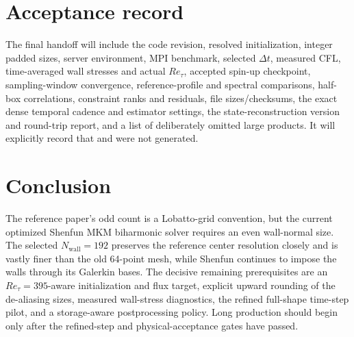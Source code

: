 \documentclass[11pt]{article}
\begin{document}
\section{Acceptance record}

The final handoff will include the code revision, resolved initialization,
integer padded sizes, server environment, MPI benchmark, selected $\Delta t$,
measured CFL, time-averaged wall stresses and actual $Re_{\tau}$, accepted
spin-up checkpoint, sampling-window convergence, reference-profile and
spectral comparisons, half-box correlations, constraint ranks and residuals,
file sizes/checksums, the exact dense temporal cadence and estimator settings,
the state-reconstruction version and round-trip report, and a list of
deliberately omitted large products.  It will explicitly record that
 and  were not generated.

\section{Conclusion}

The reference paper's odd count is a Lobatto-grid convention, but the current
optimized Shenfun MKM biharmonic solver requires an even wall-normal size.
The selected $N_{\mathrm{wall}}=192$ preserves the reference center resolution
closely and is vastly finer than the old 64-point mesh, while Shenfun continues
to impose the walls through its Galerkin bases.  The decisive remaining
prerequisites are an
$Re_{\tau}=395$-aware initialization and flux target, explicit upward rounding of
the de-aliasing sizes, measured wall-stress diagnostics, the refined
full-shape time-step pilot, and a storage-aware postprocessing policy.  Long
production should begin only after the refined-step and physical-acceptance
gates have passed.
\end{document}
